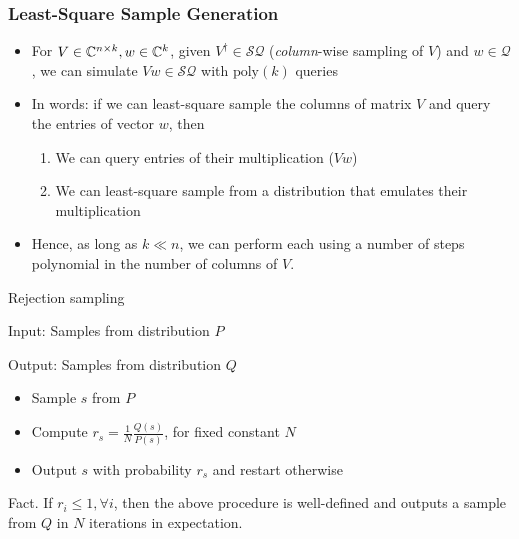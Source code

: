 \documentclass[main.tex]{subfiles}
\begin{document}
\subsubsection{Least-Square Sample Generation}

\begin{itemize}
	\item For $V \in \mathbb{C}^{n\times k}, w \in \mathbb{C}^k$, given $V^\dagger \in \mathcal{SQ}$ (\textit{column}-wise sampling of $V$) and $w \in \mathcal{Q}$, we can simulate $Vw \in \mathcal{SQ}$ with $\text{poly}(k)$ queries
	\item In words: if we can least-square sample the columns of matrix $V$ and query the entries of vector $w$, then
\begin{enumerate}
\item  We can query entries of their multiplication ($Vw$) 
\item We can least-square sample from a distribution that emulates their multiplication	
\end{enumerate}

\item Hence, as long as $k \ll n$, we can perform  each using a number of steps polynomial in the number of columns of $V$. 

\end{itemize}

\begin{definition}
Rejection sampling
\end{definition}
\begin{algorithm}
Input: Samples from distribution $P$

Output: Samples from distribution $Q$
\begin{itemize}
\item Sample $s$ from $P$
\item Compute $r_s = \frac{1}{N}\frac{Q(s)}{P(s)}$, for fixed constant $N$
\item Output $s$ with probability $r_s$ and restart otherwise
\end{itemize}
\end{algorithm}

\begin{fact}
Fact. If $r_i \leq 1, \forall i$, then the above procedure is well-defined and outputs a sample from $Q$ in $N$ iterations in expectation.	
\end{fact}
\end{document}
